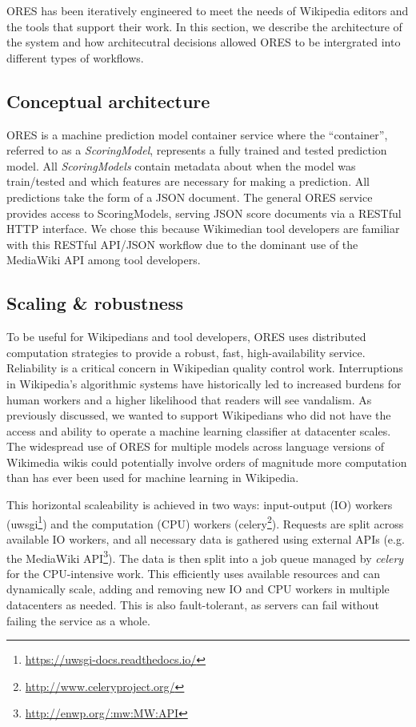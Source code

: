 ORES has been iteratively engineered to meet the needs of Wikipedia editors and the tools that support their work.  In this section, we describe the architecture of the system and how architecutral decisions allowed ORES to be intergrated into different types of workflows.  

\subsection{Conceptual architecture}
ORES is a machine prediction model container service where the ``container'', referred to as a \emph{ScoringModel}, represents a fully trained and tested prediction model.  All \emph{ScoringModels} contain metadata about when the model was train/tested and which features are necessary for making a prediction.  All predictions take the form of a JSON document.  The general ORES service provides access to ScoringModels, serving JSON score documents via a RESTful HTTP interface.  We chose this because Wikimedian tool developers are familiar with this RESTful API/JSON workflow due to the dominant use of the MediaWiki API among tool developers.

\subsection{Scaling \& robustness}
To be useful for Wikipedians and tool developers, ORES uses distributed computation strategies to provide a robust, fast, high-availability service.  Reliability is a critical concern in Wikipedian quality control work.  Interruptions in Wikipedia's algorithmic systems have historically led to increased burdens for human workers and a higher likelihood that readers will see vandalism\cite{geiger13levee}.  As previously discussed, we wanted to support Wikipedians who did not have the access and ability to operate a machine learning classifier at datacenter scales. The widespread use of ORES for multiple models across language versions of Wikimedia wikis could potentially involve orders of magnitude more computation than has ever been used for machine learning in Wikipedia.

This horizontal scaleability is achieved in two ways: input-output (IO) workers (uwsgi\footnote{\url{https://uwsgi-docs.readthedocs.io/}}) and the computation (CPU) workers (celery\footnote{\url{http://www.celeryproject.org/}}).  Requests are split across available IO workers, and all necessary data is gathered using external APIs (e.g. the MediaWiki API\footnote{\url{http://enwp.org/:mw:MW:API}}).  The data is then split into a job queue managed by \emph{celery} for the CPU-intensive work.  This efficiently uses available resources and can dynamically scale, adding and removing new IO and CPU workers in multiple datacenters as needed.  This is also fault-tolerant, as servers can fail without failing the service as a whole.

